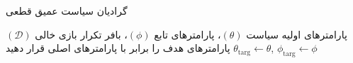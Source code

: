         
%        
        
        
        \begin{algorithm}[H]
        	\caption{گرادیان سیاست عمیق قطعی}\label{alg:DDPG}
        	\begin{algorithmic}[1]
   پارامترهای اولیه سیاست
$(\theta)$، پارامترهای تابع
$(\phi)$، بافر تکرار بازی خالی $(\mathcal{D})$
\State پارامترهای هدف را برابر با پارامترهای اصلی قرار دهید
$\theta_{\text{targ}} \leftarrow \theta$, $\phi_{\text{targ}} \leftarrow \phi$


\end{algorithmic}
\end{algorithm}
